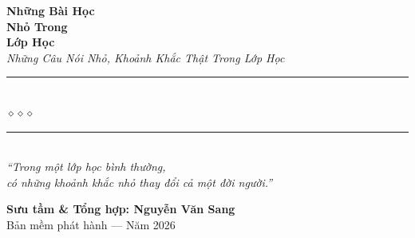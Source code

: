 \begin{titlepage}
\begin{center}
  {\fontsize{28}{34}\selectfont\bfseries\color{slateink!80!black}
    Những Bài Học}\\[0.4cm]
  {\fontsize{28}{34}\selectfont\bfseries\color{dustgold!80!black}
    Nhỏ Trong}\\[0.4cm]
  {\fontsize{28}{34}\selectfont\bfseries\color{slateink!80!black}
    Lớp Học}\\[0.4cm]

  {\fontsize{16}{20}\selectfont\color{dustgold!90!black}\itshape
    Những Câu Nói Nhỏ, Khoảnh Khắc Thật Trong Lớp Học}\\[1cm]

  {\color{brickred!60}\rule{6cm}{1pt}}\\[5pt]
  {\color{dustgold!80!black}\large$\diamond$\hspace{1cm}$\diamond$\hspace{1cm}$\diamond$}\\[5pt]
  {\color{brickred!60}\rule{6cm}{1pt}}\\[1.5cm]

  {\normalsize\itshape\color{brickred!90!black}
   ``Trong một lớp học bình thường,\\
   có những khoảnh khắc nhỏ thay đổi cả một đời người.''}

  \vfill

  {\fontsize{16}{20}\selectfont\bfseries\color{brickred!90!black}
    Sưu tầm \& Tổng hợp: \textbf{Nguyễn Văn Sang}}\\[0.4cm]

  {\small\color{gray} Bản mềm phát hành --- Năm 2026}\\[0.5cm]
\end{center}

\afterpage{\nopagecolor}
\end{titlepage}